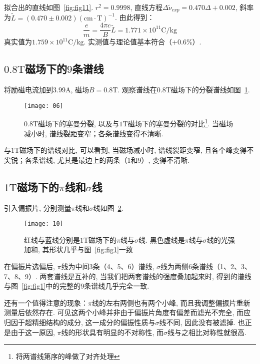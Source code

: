 \documentclass[aps,pre,12pt,preprint,onecolumn,showpacs,showkeys]{revtex4-1}
\begin{document}
拟合出的直线如图~\ref{fig:fig11}. $r^2=0.9998$, 直线方程$\Delta \tilde{\nu}_{exp}=0.470 \Delta+0.002$, 斜率为$\tilde{L}=(0.470\pm0.002)(\mathrm{cm}\cdot \mathrm T)^{-1}$. 由此得到：
\begin{equation}
\frac{e}{m}=\frac{4\pi c}{B}\tilde{L}=1.771\times 10^{11} \mathrm{C}/\mathrm{kg}
\end{equation}
真实值为$1.759\times 10^{11} \mathrm{C}/\mathrm{kg}$. 实测值与理论值基本符合（+0.6\%）. 
\subsection{$0.8\mathrm T$磁场下的$9$条谱线}
将励磁电流加到$3.99\mathrm{A}$, 磁场$B=0.8\mathrm{T}$. 观察谱线在$0.8\mathrm{T}$磁场下的分裂谱线如图~\ref{fig:fig2}. 
\begin{figure}[h]
\centering
\texttt{[image: 06]}
\caption{\label{fig:fig2}%
$0.8\mathrm T$磁场下的塞曼分裂, 以及与$1\mathrm T$磁场下的塞曼分裂的对比\footnote{将两谱线第\uppercase{}序的峰做了对齐处理}. 当磁场减小时, 谱线裂距变窄；各条谱线变得不清晰. }
\end{figure}

与$1\mathrm{T}$磁场下的谱线对比, 可以看到, 当磁场减小时, 谱线裂距变窄, 且各个峰变得不尖锐；各条谱线, 尤其是最边上的两条（1和9）, 变得不清晰. 

\subsection{$1\mathrm T$磁场下的$\pi$线和$\sigma$线}
引入偏振片, 分别测量$\pi$线和$\sigma$线如图~\ref{fig:fig10}. 
\begin{figure}[h]
\centering
\texttt{[image: 10]}
\caption{\label{fig:fig10}%
红线与蓝线分别是$1\mathrm T$磁场下的$\pi$线与$\sigma$线. 黑色虚线是$\pi$线与$\sigma$线的光强加和, 其形状几乎与图~\ref{fig:fig1}一致}
\end{figure}

在偏振片选偏后, $\pi$线为中间3条（4、5、6）谱线, $\sigma$线为两侧6条谱线（1、2、3、7、8、9）. 两套谱线是互补的, 当我们把两套谱线的强度叠加起来时, 得到的谱线与图~\ref{fig:fig1}中的完整的9条谱线几乎完全一致. 

还有一个值得注意的现象：$\pi$线的左右两侧也有两个小峰, 而且我调整偏振片重新测量后依然存在. 可见这两个小峰并非由于偏振片角度有偏差而滤光不完全, 而应归因于超精细结构的成分, 这一成分的偏振性质与$\sigma$线不同, 因此没有被滤掉. 也正是由于这一原因, $\pi$线的形状具有明显的不对称性, 而$\sigma$线与之相比对称性就很高. 
\end{document}
